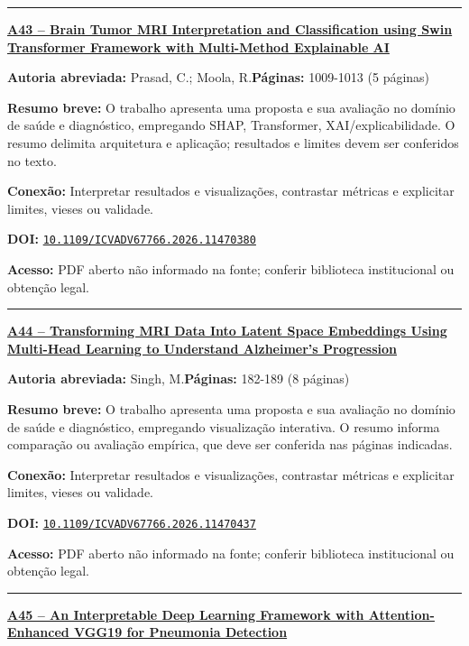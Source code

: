 \documentclass[10pt,a4paper]{article}
\begin{document}
\noindent\rule{\textwidth}{0.35pt}
\par\medskip\noindent
{\large\bfseries\href{https://doi.org/10.1109/ICVADV67766.2026.11470380}{A43 -- Brain Tumor MRI Interpretation and Classification using Swin Transformer Framework with Multi-Method Explainable AI}}\par\smallskip
\textbf{Autoria abreviada:} Prasad, C.; Moola, R.\quad \textbf{Páginas:} 1009-1013 (5 páginas)\par
\textbf{Resumo breve:} O trabalho apresenta uma proposta e sua avaliação no domínio de saúde e diagnóstico, empregando SHAP, Transformer, XAI/explicabilidade. O resumo delimita arquitetura e aplicação; resultados e limites devem ser conferidos no texto.\par
\textbf{Conexão:} Interpretar resultados e visualizações, contrastar métricas e explicitar limites, vieses ou validade.\par
\textbf{DOI:} \href{https://doi.org/10.1109/ICVADV67766.2026.11470380}{\nolinkurl{10.1109/ICVADV67766.2026.11470380}}\par
\textbf{Acesso:} PDF aberto não informado na fonte; conferir biblioteca institucional ou obtenção legal.\par
\noindent\rule{\textwidth}{0.35pt}
\par\medskip\noindent
{\large\bfseries\href{https://doi.org/10.1109/ICVADV67766.2026.11470437}{A44 -- Transforming MRI Data Into Latent Space Embeddings Using Multi-Head Learning to Understand Alzheimer's Progression}}\par\smallskip
\textbf{Autoria abreviada:} Singh, M.\quad \textbf{Páginas:} 182-189 (8 páginas)\par
\textbf{Resumo breve:} O trabalho apresenta uma proposta e sua avaliação no domínio de saúde e diagnóstico, empregando visualização interativa. O resumo informa comparação ou avaliação empírica, que deve ser conferida nas páginas indicadas.\par
\textbf{Conexão:} Interpretar resultados e visualizações, contrastar métricas e explicitar limites, vieses ou validade.\par
\textbf{DOI:} \href{https://doi.org/10.1109/ICVADV67766.2026.11470437}{\nolinkurl{10.1109/ICVADV67766.2026.11470437}}\par
\textbf{Acesso:} PDF aberto não informado na fonte; conferir biblioteca institucional ou obtenção legal.\par
\noindent\rule{\textwidth}{0.35pt}
\par\medskip\noindent
{\large\bfseries\href{https://doi.org/10.1109/ICVADV67766.2026.11470355}{A45 -- An Interpretable Deep Learning Framework with Attention-Enhanced VGG19 for Pneumonia Detection}}\par\smallskip
\end{document}
